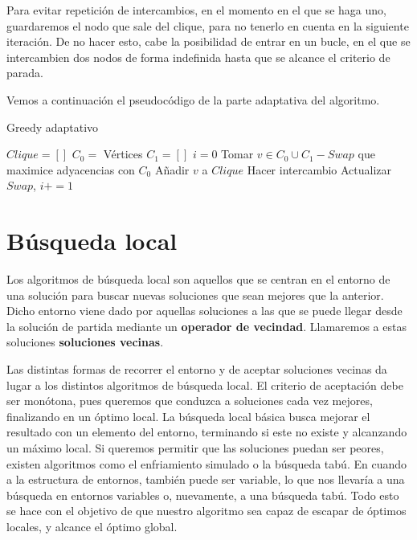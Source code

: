 Para evitar repetición de intercambios, en el momento en el que se haga uno, guardaremos
el nodo que sale del clique, para no tenerlo en cuenta en la siguiente iteración.
De no hacer esto, cabe la posibilidad de entrar en un bucle, en el que se
intercambien dos nodos de forma indefinida hasta que se alcance el criterio de parada.

Vemos a continuación el pseudocódigo de la parte adaptativa del algoritmo.


\begin{algorithm}[H]
\caption{Greedy adaptativo}
  \begin{algorithmic}
  \State $Clique = [ ]$
  \State $C_0 = $ Vértices
  \State $C_1 = [ ]$
  \State $i = 0$
  \Repeat
    \State Tomar $v \in C_0 \cup C_1 - Swap$ que maximice adyacencias con $C_0$
      \State Añadir $v$ a $Clique$
    \Else
      \State Hacer intercambio
      \State Actualizar $Swap$, $i += 1$
    \EndIf
  \end{algorithmic}
\end{algorithm}


\section{Búsqueda local}

Los algoritmos de búsqueda local son aquellos que se centran en el entorno de una
solución para buscar nuevas soluciones que sean mejores que la anterior. Dicho entorno
viene dado por aquellas soluciones a las que se puede llegar desde la solución de
partida mediante un \textbf{operador de vecindad}. Llamaremos a estas soluciones
\textbf{soluciones vecinas}.

Las distintas formas de recorrer el entorno y de aceptar soluciones vecinas da
lugar a los distintos algoritmos de búsqueda local. El criterio de aceptación debe
ser monótona, pues queremos que conduzca a soluciones cada vez mejores, finalizando
en un óptimo local. La búsqueda local básica busca mejorar el resultado con un elemento
del entorno, terminando si este no existe y alcanzando un máximo local. Si queremos
permitir que las soluciones puedan ser peores, existen algoritmos como el enfriamiento
simulado o la búsqueda tabú. En cuando a la estructura de entornos, también puede ser
variable, lo que nos llevaría a una búsqueda en entornos variables o, nuevamente,
a una búsqueda tabú. Todo esto se hace con el objetivo de que nuestro algoritmo
sea capaz de escapar de óptimos locales, y alcance el óptimo global.

